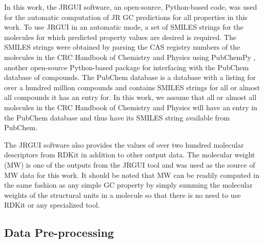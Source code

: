 \documentclass[journal=jacsat,manuscript=article]{achemso}
\begin{document}
In this work, the JRGUI \cite{shiJRguiPythonProgram2017} software, an open-source, Python-based code, was used for the automatic computation of JR GC predictions for all properties in this work. To use JRGUI in an automatic mode, a set of SMILES strings for the molecules for which predicted property values are desired is required. 
The SMILES strings were obtained by parsing the CAS registry numbers of the molecules in the CRC Handbook of Chemistry and Physics using PubChemPy \cite{PubChemPyDocumentationPubChemPy}, another open-source Python-based package for interfacing with the PubChem \cite{Kim2023} database of compounds. The PubChem database is a database with a listing for over a hundred million compounds and contains SMILES strings for all or almost all compounds it has an entry for. In this work, we assume that all or almost all molecules in the CRC Handbook of Chemistry and Physics will have an entry in the PubChem database and thus have its SMILES string available from PubChem.

The JRGUI software also provides the values of over two hundred molecular descriptors from RDKit \cite{RDKit} in addition to other output data. The molecular weight (MW) is one of the outputs from the JRGUI tool and was used as the source of MW data for this work. It should be noted that MW can be readily computed in the same fashion as any simple GC property by simply summing the molecular weights of the structural units in a molecule so that there is no need to use RDKit or any specialized tool.

\subsection{Data Pre-processing} \label{sec:preprocess}
\end{document}
